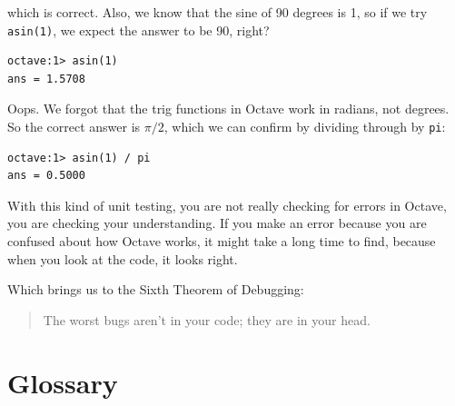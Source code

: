 \documentclass{book}
\begin{document}
which is correct. Also, we know that the sine of 90 degrees is
1, so if we try {\tt asin(1)}, we expect the answer to be 90, right?

\begin{verbatim}
octave:1> asin(1)
ans = 1.5708
\end{verbatim}

Oops. We forgot that the trig functions in Octave work in radians,
not degrees. So the correct answer is $\pi/2$, which we can
confirm by dividing through by {\tt pi}:

\begin{verbatim}
octave:1> asin(1) / pi
ans = 0.5000
\end{verbatim}

With this kind of unit testing, you are not really checking for
errors in Octave, you are checking your understanding. If you
make an error because you are confused about how Octave works, it
might take a long time to find, because when you look at the code,
it looks right. 

Which brings us to the Sixth Theorem of Debugging:

\begin{quote}
The worst bugs aren't in your code; they are in your head.
\end{quote}



\section{Glossary}
\end{document}

